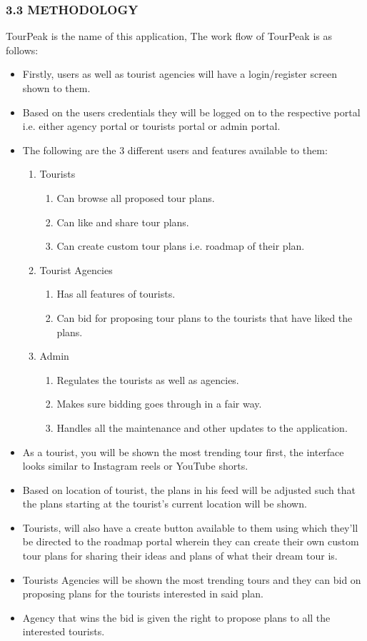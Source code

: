 \documentclass[12pt,a4paper]{article}
\begin{document}
\subsubsection*{3.3 METHODOLOGY}
TourPeak is the name of this application, The work flow of TourPeak is as follows:
\begin{itemize}
	\item Firstly, users as well as tourist agencies will have a login/register screen shown to
	them.
	\item Based on the users credentials they will be logged on to the respective portal i.e.
	either agency portal or tourists portal or admin portal.
	\item The following are the 3 different users and features available to them:
	
	\begin{enumerate}
	\item Tourists
		\begin{enumerate}
	    	\item Can browse all proposed tour plans.
			\item Can like and share tour plans.
			\item Can create custom tour plans i.e. roadmap of their plan.
		\end{enumerate}
	\item Tourist Agencies
		\begin{enumerate}
		\item Has all features of tourists.
		\item Can bid for proposing tour plans to the tourists that have liked
		the plans.
		\end{enumerate}
	\item Admin
	\begin{enumerate}
		\item Regulates the tourists as well as agencies.
		\item Makes sure bidding goes through in a fair way.
		\item Handles all the maintenance and other updates to the application.
	\end{enumerate}

	\end{enumerate}
	\item As a tourist, you will be shown the most trending tour first, the interface looks similar
to Instagram reels or YouTube shorts.
\item Based on location of tourist, the plans in his feed will be adjusted such that the plans
starting at the tourist’s current location will be shown.
\item Tourists, will also have a create button available to them using which they’ll be
directed to the roadmap portal wherein they can create their own custom tour plans for
sharing their ideas and plans of what their dream tour is.
\item Tourists Agencies will be shown the most trending tours and they can bid on
proposing plans for the tourists interested in said plan.
\item Agency that wins the bid is given the right to propose plans to all the interested
tourists.
\end{itemize}
\end{document}
